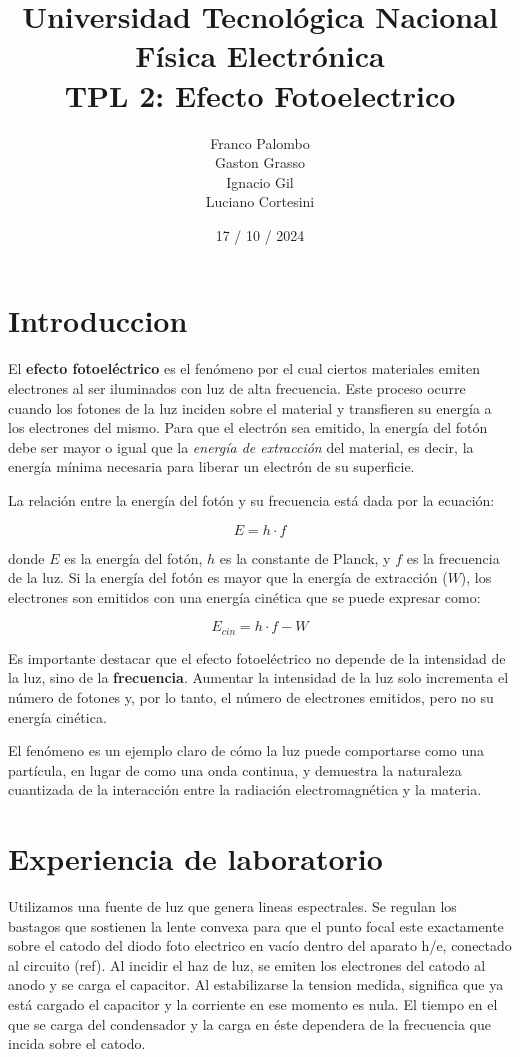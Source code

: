 \documentclass[a4paper,12pt]{report}
\title{%
  \fontsize{25}{0}\selectfont Universidad Tecnológica Nacional \\
  \fontsize{22}{30}\selectfont Física Electrónica \\
  \fontsize{18}{25}\selectfont TPL 2: Efecto Fotoelectrico
}
\author{
Franco Palombo\\
Gaston Grasso\\
Ignacio Gil\\
Luciano Cortesini\\
}
\date{17 / 10 / 2024}
\begin{document}
\maketitle

\chapter{Introduccion}
  El \textbf{efecto fotoeléctrico} es el fenómeno por el cual ciertos materiales emiten electrones al ser iluminados
  con luz de alta frecuencia. Este proceso ocurre cuando los fotones de la luz inciden sobre el material y transfieren
  su energía a los electrones del mismo. Para que el electrón sea emitido, la energía del fotón debe ser mayor o igual
  que la \textit{energía de extracción} del material, es decir, la energía mínima necesaria para liberar un electrón de
  su superficie.


  La relación entre la energía del fotón y su frecuencia está dada por la ecuación:

  \[
    E = h \cdot f
  \]

  donde \(E\) es la energía del fotón, \(h\) es la constante de Planck, y \(f\) es la frecuencia de la luz. Si la
  energía del fotón es mayor que la energía de extracción (\(W\)), los electrones son emitidos con una energía cinética
  que se puede expresar como:


  \[
    E_{cin} = h \cdot f - W
  \]

  Es importante destacar que el efecto fotoeléctrico no depende de la intensidad de la luz, sino de la
  \textbf{frecuencia}. Aumentar la intensidad de la luz solo incrementa el número de fotones y, por lo tanto, el número
  de electrones emitidos, pero no su energía cinética.

  El fenómeno es un ejemplo claro de cómo la luz puede comportarse como una partícula, en lugar de como una onda
  continua, y demuestra la naturaleza cuantizada de la interacción entre la radiación electromagnética y la materia.

\chapter{Experiencia de laboratorio}
  Utilizamos una fuente de luz que genera lineas espectrales. Se regulan los bastagos que sostienen la lente convexa
  para que el punto focal este exactamente sobre el catodo del diodo foto electrico en vacío dentro del aparato h/e,
  conectado al circuito (ref). Al incidir el haz de luz, se emiten los electrones del catodo al anodo y se carga el
  capacitor. Al estabilizarse la tension medida, significa que ya está cargado el capacitor y la corriente en ese
  momento es nula. El tiempo en el que se carga del condensador y la carga en éste dependera de la frecuencia que
  incida sobre el catodo.
\end{document}
